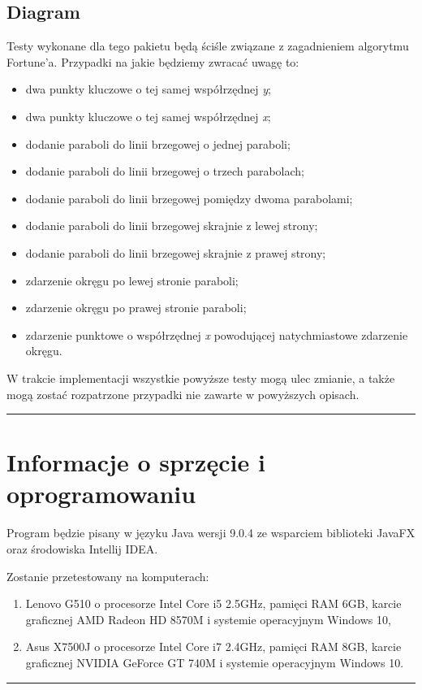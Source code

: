 \documentclass[a4paper,11pt]{article}
\newcommand{\linia}{\rule{\linewidth}{0.4mm}}
\begin{document}
\subsection{Diagram}
Testy wykonane dla tego pakietu będą ściśle związane z zagadnieniem algorytmu Fortune'a. Przypadki na jakie będziemy zwracać uwagę to:
\begin{itemize}
\item dwa punkty kluczowe o tej samej współrzędnej \textit{y};
\item dwa punkty kluczowe o tej samej współrzędnej \textit{x};
\item dodanie paraboli do linii brzegowej o jednej paraboli;
\item dodanie paraboli do linii brzegowej o trzech parabolach;
\item dodanie paraboli do linii brzegowej pomiędzy dwoma parabolami;
\item dodanie paraboli do linii brzegowej skrajnie z lewej strony;
\item dodanie paraboli do linii brzegowej skrajnie z prawej strony;
\item zdarzenie okręgu po lewej stronie paraboli;
\item zdarzenie okręgu po prawej stronie paraboli;
\item zdarzenie punktowe o współrzędnej \textit{x} powodującej natychmiastowe zdarzenie okręgu.
\end{itemize}

W trakcie implementacji wszystkie powyższe testy mogą ulec zmianie, a także mogą zostać rozpatrzone przypadki nie zawarte w powyższych opisach.

\noindent\linia
\section{Informacje o sprzęcie i oprogramowaniu}
Program będzie pisany w języku Java wersji 9.0.4 ze wsparciem biblioteki JavaFX oraz środowiska Intellij IDEA.

Zostanie przetestowany na komputerach:
\begin{enumerate}
\item Lenovo G510 o procesorze Intel Core i5 2.5GHz, pamięci RAM 6GB, karcie graficznej AMD Radeon
HD 8570M i systemie operacyjnym Windows 10,
\item Asus X7500J o procesorze Intel Core i7 2.4GHz, pamięci RAM 8GB, karcie graficznej NVIDIA GeForce GT 740M i systemie operacyjnym Windows 10. 
\end{enumerate} 
\noindent\linia
\end{document}
